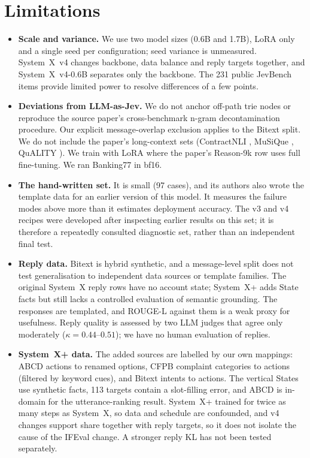 \documentclass[11pt]{article}
\newcommand{\sysplus}{System~X+}
\newcommand{\sysfour}{System~X~v4}
\newcommand{\sysfoursmall}{System~X~v4-0.6B}
\begin{document}
\section{Limitations}
\begin{itemize}
\item \textbf{Scale and variance.} We use two model sizes (0.6B and 1.7B), LoRA only and a single seed per configuration; seed variance is unmeasured. \sysfour{} changes backbone, data balance and reply targets together, and \sysfoursmall{} separates only the backbone. The 231 public JevBench items provide limited power to resolve differences of a few points.
\item \textbf{Deviations from LLM-as-Jev.} We do not anchor off-path trie nodes or reproduce the source paper's cross-benchmark n-gram decontamination procedure. Our explicit message-overlap exclusion applies to the Bitext split. We do not include the paper's long-context sets (ContractNLI \citep{koreeda2021contractnli}, MuSiQue \citep{trivedi2022musique}, QuALITY \citep{pang2022quality}). We train with LoRA where the paper's Reason-9k row uses full fine-tuning. We ran Banking77 in bf16.
\item \textbf{The hand-written set.} It is small (97 cases), and its authors also wrote the template data for an earlier version of this model. It measures the failure modes above more than it estimates deployment accuracy. The v3 and v4 recipes were developed after inspecting earlier results on this set; it is therefore a repeatedly consulted diagnostic set, rather than an independent final test.
\item \textbf{Reply data.} Bitext is hybrid synthetic, and a message-level split does not test generalisation to independent data sources or template families. The original System~X reply rows have no account state; \sysplus{} adds State facts but still lacks a controlled evaluation of semantic grounding. The responses are templated, and ROUGE-L against them is a weak proxy for usefulness. Reply quality is assessed by two LLM judges that agree only moderately ($\kappa=0.44$--$0.51$); we have no human evaluation of replies.
\item \textbf{\sysplus{} data.} The added sources are labelled by our own mappings: ABCD actions to renamed options, CFPB complaint categories to actions (filtered by keyword cues), and Bitext intents to actions. The vertical States use synthetic facts, 113 targets contain a slot-filling error, and ABCD is in-domain for the utterance-ranking result. \sysplus{} trained for twice as many steps as System~X, so data and schedule are confounded, and v4 changes support share together with reply targets, so it does not isolate the cause of the IFEval change. A stronger reply KL has not been tested separately.

\end{itemize}
\end{document}
